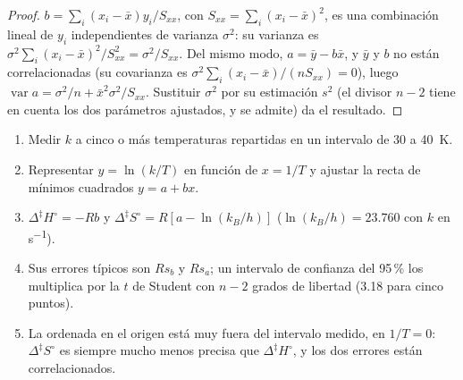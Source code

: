 \begin{proof}
$b = \sum_i(x_i - \bar x)y_i/S_{xx}$, con $S_{xx} = \sum_i(x_i - \bar x)^2$, es una combinación lineal de
$y_i$ independientes de varianza $\sigma^2$: su varianza es $\sigma^2\sum_i(x_i - \bar x)^2/S_{xx}^2 = \sigma^2/S_{xx}$.
Del mismo modo, $a = \bar y - b\bar x$, y $\bar y$ y $b$ no están correlacionadas (su covarianza es
$\sigma^2\sum_i(x_i - \bar x)/(nS_{xx}) = 0$), luego $\operatorname{var}a = \sigma^2/n + \bar x^2\sigma^2/S_{xx}$. Sustituir $\sigma^2$
por su estimación $s^2$ (el divisor $n - 2$ tiene en cuenta los dos parámetros
ajustados, y se admite) da el resultado.
\end{proof}

\begin{method}\label{met:b3:rate-theories:eyring-plot}
\begin{enumerate}
  \item Medir $k$ a cinco o más temperaturas repartidas en un intervalo de 30 a \qty{40}{K}.
  \item Representar $y = \ln(k/T)$ en función de $x = 1/T$ y ajustar la recta de mínimos cuadrados $y = a + bx$.
  \item $\Delta^{\ddagger}H^\circ = -Rb$ y $\Delta^{\ddagger}S^\circ = R[a - \ln(k_B/h)]$ ($\ln(k_B/h) = 23.760$ con $k$ en
        \unit{s^{-1}}).
  \item Sus errores típicos son $Rs_b$ y $Rs_a$; un intervalo de confianza del 95\,\%
        los multiplica por la $t$ de Student con $n - 2$ grados de libertad (3.18 para
        cinco puntos).
  \item La ordenada en el origen está muy fuera del intervalo medido, en $1/T = 0$: $\Delta^{\ddagger}S^\circ$
        es siempre mucho menos precisa que $\Delta^{\ddagger}H^\circ$, y los dos errores están
        correlacionados.
\end{enumerate}
\end{method}

